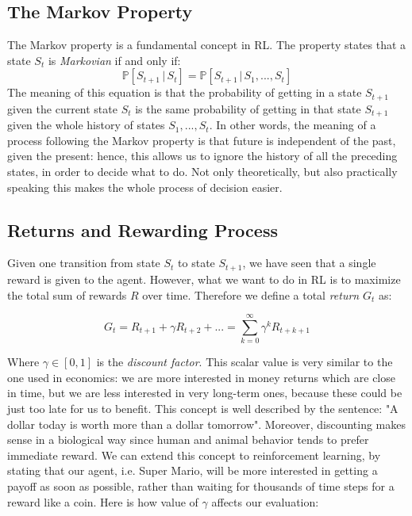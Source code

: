\subsection{The Markov Property}
\label{sec:markov}
The Markov property is a fundamental concept in RL. The property states that a state $S_t$ is \textit{Markovian} if and only if:
\begin{equation}
	\mathbb{P}[S_{t+1} \,|\, S_t]  = \mathbb{P}[S_{t+1\,} |\, S_1, ..., S_t] 
\end{equation}
The meaning of this equation is that the probability of getting in a state $S_{t+1}$ given the current state $S_t$ is the same probability of getting in that state $S_{t+1}$ given the whole history of states $S_1, ..., S_t$. In other words, the meaning of a process following the Markov property is that future is independent of the past, given the present: hence, this allows us to ignore the history of all the preceding states, in order to decide what to do. Not only theoretically, but also practically speaking this makes the whole process of decision easier.



\subsection{Returns and Rewarding Process}
Given one transition from state $S_t$ to state $S_{t+1}$, we have seen that a single reward is given to the agent. However, what we want to do in RL is to maximize the total sum of rewards $R$ over time. Therefore we define a total \textit{return} $G_t$ as:

\begin{equation}
	G_t  =  R_{t+1} + \gamma R_{t+2} + ...  =  \sum_{k=0}^{\infty}\gamma^k R_{t+k+1}
\end{equation}

Where $\gamma \in [0,1]$ is the \textit{discount factor}. This scalar value is very similar to the one used in economics: we are more interested in money returns which are close in time, but we are less interested in very long-term ones, because these could be just too late for us to benefit. This concept is well described by the sentence: "A dollar today is worth more than a dollar tomorrow". Moreover, discounting makes sense in a biological way since human and animal behavior tends to prefer immediate reward. We can extend this concept to reinforcement learning, by stating that our agent, i.e. Super Mario, will be more interested in getting a payoff as soon as possible, rather than waiting for thousands of time steps for a reward like a coin. Here is how value of $\gamma$ affects our evaluation:

